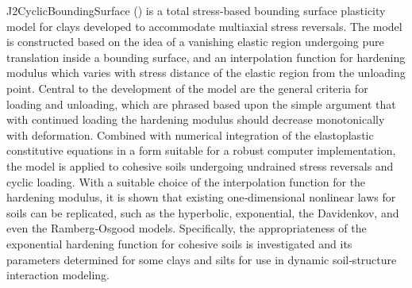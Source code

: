  J2CyclicBoundingSurface (\cite{borja1994multiaxial}) is a 
  total stress‐based bounding surface plasticity model for clays developed to accommodate multiaxial stress reversals. 
  The model is constructed based on the idea of a vanishing elastic region undergoing pure translation inside a bounding surface, and an interpolation function for hardening modulus which varies with stress distance of the elastic region from the unloading point. 
  Central to the development of the model are the general criteria for loading and unloading, 
  which are phrased based upon the simple argument that with continued loading the hardening modulus should decrease monotonically with deformation. 
  Combined with numerical integration of the elastoplastic constitutive equations in a form suitable for a robust computer implementation, 
  the model is applied to cohesive soils undergoing undrained stress reversals and cyclic loading. 
  With a suitable choice of the interpolation function for the hardening modulus,
   it is shown that existing one‐dimensional nonlinear laws for soils can be replicated, 
   such as the hyperbolic, exponential, the Davidenkov, and even the Ramberg‐Osgood models. 
   Specifically, the appropriateness of the exponential hardening function for cohesive soils is investigated and its parameters determined for some clays and silts for use in dynamic soil‐structure interaction modeling.\\


